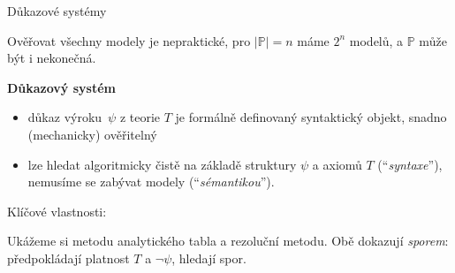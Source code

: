 \documentclass{beamer}
\begin{document}
\begin{frame}{Důkazové systémy}

    Ověřovat všechny modely je nepraktické, pro $|\mathbb P|=n$ máme $2^n$ modelů, a $\mathbb P$ může být i nekonečná.

    \textbf{Důkazový systém}
    \begin{itemize}
        \item \alert{důkaz} výroku~\( \psi \) z teorie \(T\) je formálně definovaný syntaktický objekt, snadno (mechanicky) ověřitelný
        \item lze hledat algoritmicky čistě na základě struktury \( \psi \) a axiomů \(T\) (``\emph{syntaxe}''), nemusíme se zabývat modely (``\emph{sémantikou}'').
    \end{itemize}        
    Klíčové vlastnosti:


    Ukážeme si \alert{metodu analytického tabla} a \alert{rezoluční metodu}. Obě dokazují \emph{sporem}: předpokládají platnost $T$ a \( \neg \psi \), hledají spor.

\end{frame}

\end{document}

